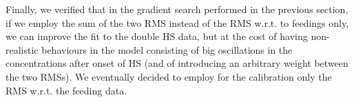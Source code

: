 \documentclass[oneside, 10pt, a4paper, twocolumn]{article}
\begin{document}
Finally, we verified that in the gradient search performed in the previous section, if we employ the sum of the two RMS instead of the RMS w.r.t. to feedings only, we can improve the fit to the double HS data, but at the cost of having non-realistic behaviours in the model consisting of big oscillations in the concentrations after onset of HS (and of introducing an arbitrary weight between the two RMSs). We eventually decided to employ for the calibration only the RMS w.r.t. the feeding data.






\end{document}

